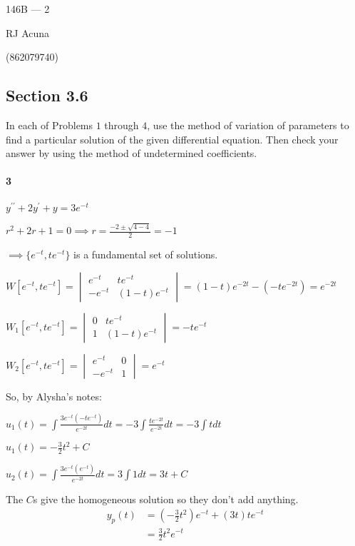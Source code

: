 \documentclass{article}
\begin{document}
\begin{center}
  146B --- 2

  RJ Acuna

  (862079740)
\end{center}\vspace{1.618em}

\subsection*{Section 3.6}

In each of Problems $1$ through $4$, use the method of variation of parameters to find a particular
solution of the given differential equation. Then check your answer by using the method of
undetermined coefficients.

\paragraph{3} $y^{\prime\prime} + 2y^\prime + y = 3e^{-t}$


$r^2+2r+1 = 0 \implies r = \frac{-2\pm\sqrt{4-4}}{2} = -1$

$\implies \{e^{-t},te^{-t}\}$ is a fundamental set of solutions.

$W[e^{-t},te^{-t}] = \begin{vmatrix}e^{-t}&te^{-t}\\ -e^{-t}&
  (1-t)e^{-t}\end{vmatrix} = (1-t)e^{-2t}-(-te^{-2t}) = e^{-2t}$

$W_1[e^{-t},te^{-t}] = \begin{vmatrix}0&te^{-t}\\ 1&
  (1-t)e^{-t}\end{vmatrix} = -te^{-t}$

$W_2[e^{-t},te^{-t}] = \begin{vmatrix}e^{-t}&0\\ -e^{-t}&
  1\end{vmatrix} = e^{-t}$

So, by Alysha's notes:

$u_1(t) = \int \frac{3e^{-t}(-te^{-t})}{e^{-2t}} dt =-3 \int
\frac{te^{-2t}}{e^{-2t}} dt = -3\int t dt$


$u_1(t) = -\frac{3}{2}t^2 + C$

$u_2(t) = \int \frac{3e^{-t}(e^{-t})}{e^{-2t}} dt = 3 \int 1 dt =
3t + C$

The $C$s give the homogeneous solution so they don't add anything.
\begin{align*}
y_p(t) &= (-\frac{3}{2}t^2)e^{-t}
      +(3t)te^{-t}\\
    &= \frac{3}{2}t^2e^{-t}
\end{align*}
\end{document}
